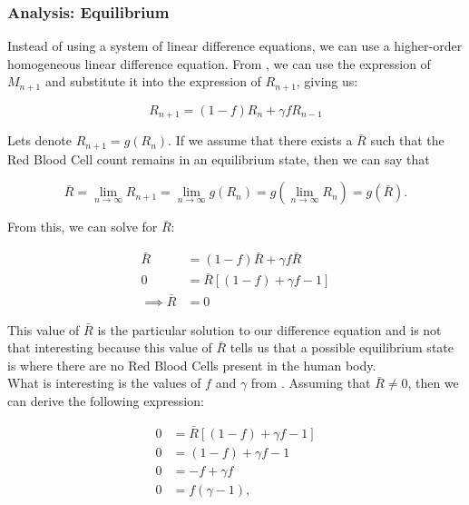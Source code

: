 \subsubsection{Analysis: Equilibrium}

Instead of using a system of linear difference equations, we can use a higher-order homogeneous linear difference equation. From , we can use the expression of $M_{n+1}$ and substitute it into the expression of $R_{n+1}$, giving us:

\begin{equation}
    R_{n+1} =  (1-f)R_n + \gamma fR_{n-1}
    \label{eq:linear-difference-model-equation}
\end{equation}

Lets denote $R_{n+1} = g(R_n)$.
If we assume that there exists a $\bar{R}$ such that the Red Blood Cell count remains in an equilibrium state, then we can say that

\[
\bar{R} = \lim_{n\to\infty} R_{n+1} = \lim_{n\to\infty} g(R_n) = g\left(\lim_{n\to\infty} R_n\right) = g(\bar{R}).
\]

From this, we can solve for $\bar{R}$:

\begin{align}
    \bar{R} &= (1-f)\bar{R} + \gamma f\bar{R} \nonumber\\
    0 &= \bar{R}[(1-f) + \gamma f - 1] \nonumber \\ 
    \implies \bar{R} &= 0 \label{eq:R-bar-value}
\end{align}

This value of $\bar{R}$ is the particular solution to our difference equation and is not that interesting because this value of $\bar{R}$ tells us that a possible equilibrium state is where there are no Red Blood Cells present in the human body. \\

What is interesting is the values of $f$ and $\gamma$ from . Assuming that $\bar{R} \neq 0$, then we can derive the following expression:

\begin{align} 
    0 &= \bar{R}[(1-f) + \gamma f - 1] \nonumber\\
    0 &= (1-f) + \gamma f - 1 \nonumber\\
    0 &= -f + \gamma f \nonumber\\
    0 &= f(\gamma - 1), \label{eq:parameter-values}
\end{align}

